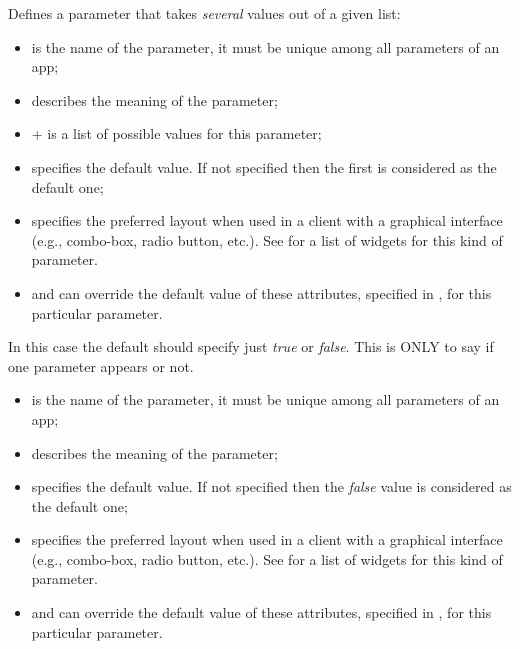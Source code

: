 \bigskip
{}
{
%
  Defines a parameter that takes \emph{several} values out of a given
  list:

  \begin{itemize}
  \item {} is the name of the parameter, it must be
    unique among all parameters of an app;

  \item {} describes the meaning of the parameter;

  \item {}+ is a list of possible values for
    this parameter;

  \item {} specifies the default
    value. If not specified then the first 
    is considered as the default one;

  \item {} specifies the preferred layout when
    used in a client with a graphical interface (e.g., combo-box,
    radio button, etc.). See  for a list of
    widgets for this kind of parameter.
\item {} and  can override the default value of these attributes, specified in , for this particular parameter.
  \end{itemize}
 } {}

\bigskip
{}
{In this case the default should specify just \emph{true} or
  \emph{false}. This is ONLY to say if one parameter appears or not.
  \begin{itemize}
  \item {} is the name of the parameter, it must be
    unique among all parameters of an app;

  \item {} describes the meaning of the parameter;

  \item {} specifies the default
    value. If not specified then the \emph{false} value is considered as the default one;

  \item {} specifies the preferred layout when
    used in a client with a graphical interface (e.g., combo-box,
    radio button, etc.). See  for a list of
    widgets for this kind of parameter.
\item {} and  can override the default value of these attributes, specified in , for this particular parameter.
  \end{itemize}
}
{}

